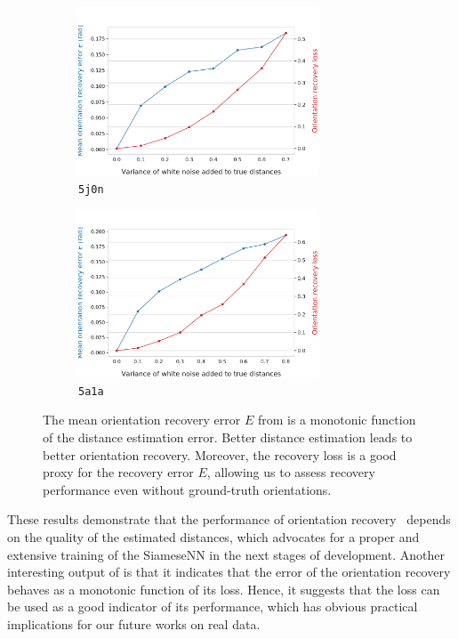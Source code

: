 \begin{figure}[ht!]
    \centering
    \begin{subfigure}[b]{0.48\linewidth}
        \includegraphics[height=5cm]{figures/5j0n_perfect_noisy_ar_aa}
        \caption{\texttt{5j0n}}
    \end{subfigure}
    \hfill
    \begin{subfigure}[b]{0.50\linewidth}
    \centering
        \includegraphics[height=5cm]{figures/5a1a_perfect_noisy_ar_aa}
        \caption{\texttt{5a1a}}
    \end{subfigure}
    \caption{
        The mean orientation recovery error $E$ from  is a monotonic function of the distance estimation error.
        Better distance estimation leads to better orientation recovery.
        Moreover, the recovery loss  is a good proxy for the recovery error $E$, allowing us to assess recovery performance even without ground-truth orientations.
}
    \label{fig:perfect-with-noise-ar-aa}
\end{figure}

These results demonstrate that the performance of orientation recovery~ depends on the quality of the estimated distances, which advocates for a proper and extensive training of the SiameseNN in the next stages of development.
Another interesting output of  is that it indicates that the error of the orientation recovery behaves as a monotonic function of its loss.
Hence, it suggests that the loss can be used as a good indicator of its performance, which has obvious practical implications for our future works on real data.

